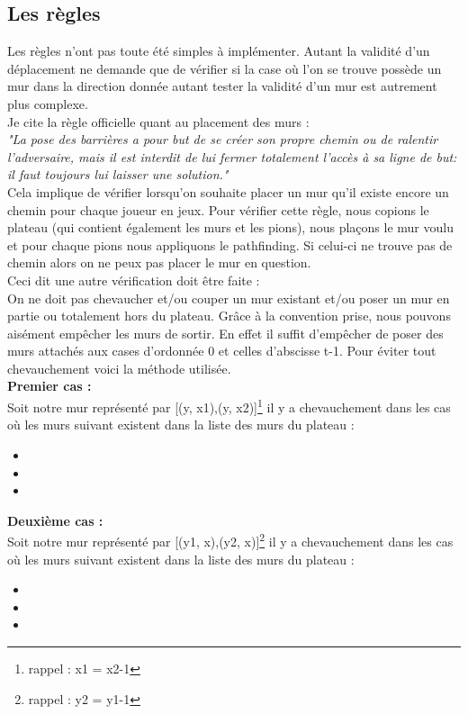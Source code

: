 \documentclass[a4paper, 12pt]{article}
\begin{document}
\subsection{Les règles}
Les règles n'ont pas toute été simples à implémenter. Autant la validité d'un déplacement ne demande que de vérifier si la case où l'on se trouve possède un mur dans la direction donnée autant tester la validité d'un mur est autrement plus complexe. \\
Je cite la règle officielle quant au placement des murs : \\
\textit{"La pose des barrières a pour but de se créer son propre chemin ou de ralentir l’adversaire, mais il est interdit de lui fermer totalement l’accès à sa ligne de but: il faut toujours lui laisser une solution."} \\
Cela implique de vérifier lorsqu'on souhaite placer un mur qu'il existe encore un chemin pour chaque joueur en jeux. Pour vérifier cette règle, nous copions le plateau (qui contient également les murs et les pions), nous plaçons le mur voulu et pour chaque pions nous appliquons le pathfinding. Si celui-ci ne trouve pas de chemin alors on ne peux pas placer le mur en question.\\
Ceci dit une autre vérification doit être faite : \\
On ne doit pas chevaucher et/ou couper un mur existant et/ou poser un mur en partie ou totalement hors du plateau.
Grâce à la convention prise, nous pouvons aisément empêcher les murs de sortir. En effet il suffit d'empêcher de poser des murs attachés aux cases d'ordonnée 0 et celles d'abscisse t-1. Pour éviter tout chevauchement voici la méthode utilisée.\\
\textbf{Premier cas :} \\
 Soit notre mur représenté par [(y, x1),(y, x2)]\footnote{rappel : x1 = x2-1} il y a chevauchement dans les cas où les murs suivant existent dans la liste des murs du plateau :
\begin{itemize}
\item[•] [(y, x1),(y, x2)]
\item[•] [(y, x1-1),(y, x1)]
\item[•] [(y, x2),(y, x2+1)]
\end{itemize}
\textbf{Deuxième cas :} \\
 Soit notre mur représenté par [(y1, x),(y2, x)]\footnote{rappel : y2 = y1-1} il y a chevauchement dans les cas où les murs suivant existent dans la liste des murs du plateau :
\begin{itemize}
\item[•] [(y1, x),(y2, x)]
\item[•] [(y1+1, x),(y1, x)]
\item[•] [(y2, x),(y2-1, x)]
\end{itemize}
\end{document}
